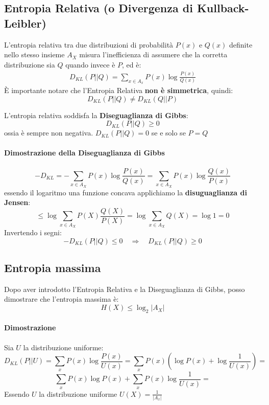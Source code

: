 \newpage
\subsection{Entropia Relativa (o Divergenza di Kullback-Leibler)}
L'entropia relativa tra due distribuzioni di probabilità $P(x)$ e $Q(x)$ definite nello stesso insieme $A_X$ misura l'inefficienza di assumere che la corretta distribuzione sia $Q$ quando invece è $P$, ed è:
\begin{equation}
	\begin{aligned}
		D_{KL}(P||Q)=\sum_{x\in A_x}P(x)\log\frac{P(x)}{Q(x)}
	\end{aligned}
\end{equation}
È importante notare che l'Entropia Relativa \textbf{non è simmetrica}, quindi:
$$
D_{KL}(P||Q) \neq D_{KL}(Q||P)
$$

L'entropia relativa soddisfa la \textbf{Diseguaglianza di Gibbs}:
\begin{equation}
	D_{KL}(P||Q) \geq 0
\end{equation}
ossia è sempre non negativa. $D_{KL}(P||Q) = 0$ se e solo se $P = Q$

\paragraph{Dimostrazione della Diseguaglianza di Gibbs}
$$
-D_{KL}=-\sum_{x\in A_X}P(x)\log\frac{P(x)}{Q(x)} = \sum_{x\in A_X}P(x)\log\frac{Q(x)}{P(x)}
$$
essendo il logaritmo una funzione concava applichiamo la \textbf{disuguaglianza di Jensen}:
$$
\le\log\sum_{x\in A_X} P(X)\frac{Q(X)}{P(X)} = \log\sum_{x\in A_X} Q(X)=\log1=0
$$
Invertendo i segni:
$$
-D_{KL}(P||Q)\leq0 \quad\Rightarrow\quad D_{KL}(P||Q)\geq0
$$

\subsection{Entropia massima}
Dopo aver introdotto l'Entropia Relativa e la Diseguaglianza di Gibbs, posso dimostrare che l'entropia massima è:
$$
H(X) \leq \log_2 |A_X|
$$

\paragraph{Dimostrazione}
Sia $U$ la distribuzione uniforme:
$$
D_{KL}(P||U) = \sum_xP(x)\log\frac{P(x)}{U(x)} = \sum_xP(x)\left(\log P(x) +\log\frac{1}{U(x)}\right) = 
$$
$$
\sum_xP(x)\log P(x)+\sum_xP(x)\log \frac{1}{U(x)} =
$$
Essendo $U$ la distribuzione uniforme $U(X)=\frac{1}{\left|A_x\right|}$

